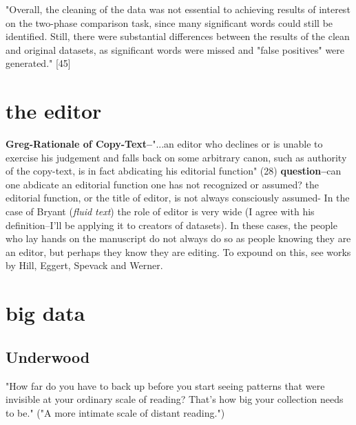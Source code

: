 \documentclass[course, english]{Notes}
\begin{document}
 "Overall, the cleaning of the data was not essential to achieving results of interest on the two-phase comparison task, since many significant words could still be identified. Still, there were substantial differences between the results of the clean and original datasets, as significant words were missed and "false positives" were generated." [45]

\section{the editor}
\begin{outline}
\1 \textbf{Greg-Rationale of Copy-Text--}"...an editor who declines or is unable to exercise his judgement and falls back on some arbitrary canon, such as authority of the copy-text, is in fact abdicating his editorial function" (28)
	\2 \textbf{question--}can one abdicate an editorial function one has not recognized or assumed?
	\2 the editorial function, or the title of editor, is not always consciously assumed- In the case of Bryant (\textit{fluid text}) the role of editor is very wide (I agree with his definition--I'll be applying it to creators of datasets). In these cases, the people who lay hands on the manuscript do not always do so as people knowing they are an editor, but perhaps they know they are editing. 
		\3 To expound on this, see works by Hill, Eggert, Spevack and Werner. 
		

\end{outline}


\section{big data}

\subsection{Underwood}
 "How far do you have to back up before you start seeing patterns that were invisible at your ordinary scale of reading? That’s how big your collection needs to be." 
("A more intimate scale of distant reading.")
	
	
\end{document}
